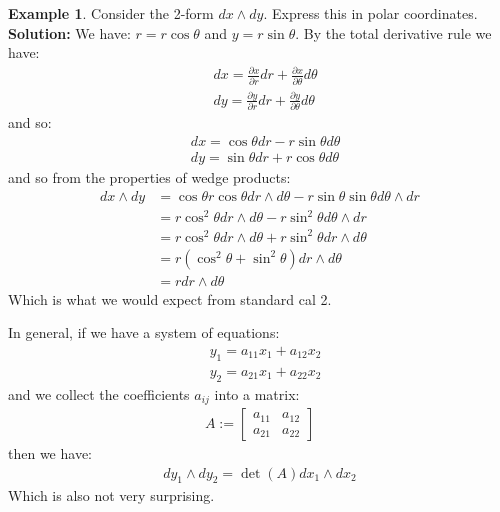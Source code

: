 \documentclass[11pt]{scrartcl}
\theoremstyle{definition}
\newtheorem{ex}{Example}
\theoremstyle{remark}
\begin{document}
{\begin{ex}
	Consider the 2-form $dx \wedge dy$. Express this in polar coordinates. 
	\newline
	\textbf{Solution:} We have: $r = r \cos \theta$ and $y = r \sin \theta$. By the total derivative rule we have: 
	\begin{align*}
		& dx = \frac{\partial x}{\partial r} dr + \frac{\partial x}{\partial \theta} d \theta  \\
		& dy = \frac{\partial y}{\partial r} dr + \frac{\partial y}{\partial \theta} d \theta 
	\end{align*}
	and so: 
	\begin{align*}
		& dx = \cos \theta dr - r \sin \theta d \theta \\
		& dy = \sin \theta d r + r \cos \theta d \theta 
	\end{align*}
	and so from the properties of wedge products: 
	\begin{align*}
		dx \wedge dy & = \cos \theta r \cos \theta dr \wedge d \theta - r \sin \theta \sin \theta d \theta \wedge dr \\
			& = r \cos^2 \theta dr \wedge d \theta - r \sin ^2 \theta d \theta \wedge d r \\
			& = r \cos^2 \theta dr \wedge d \theta + r \sin ^2 \theta  d r \wedge d \theta \\
			& = r ( \cos^2 \theta + \sin ^2 \theta) dr \wedge d \theta \\
			& = r dr \wedge d \theta 
	\end{align*}
	Which is what we would expect from standard cal 2. 
\end{ex}

In general, if we have a system of equations: 
\begin{align*}
	& y_1 = a_{11} x_1 + a_{12} x_2 \\
	& y_2 = a_{21} x_1 + a_{22} x_2 
\end{align*}
and we collect the coefficients $a_{ij}$ into a matrix: 
\begin{align*}
	A := \begin{bmatrix}
		a_{11} & a_{12} \\
		a_{21} & a_{22}
	\end{bmatrix}
\end{align*}
then we have: 
\begin{align*}
	d y_1 \wedge d y_2 = \det (A) dx_1 \wedge d x_2
\end{align*}
Which is also not very surprising. 

}
\end{document}
